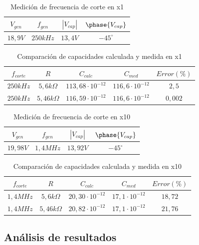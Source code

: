 \begin{table}[H]
	\centering
	\caption{Medici\'on de frecuencia de corte en x1}
	\begin{tabular}{c c c c}
		$V_{gen}$ & $f_{gen}$ & $|V_{cap}|$ & $\phase{V_{cap}}$ \\
		\hline
		$18,9V$ & $250kHz$ & $13,4V$ & $-45^{\circ}$		
	\end{tabular}
\end{table}

\begin{table}[H]
	\centering
	\caption{Comparaci\'on de capacidades calculada y medida en x1}
	\begin{tabular}{c c c c c}
		$f_{corte}$ & $R$ & $C_{calc}$ & $C_{med}$ & $Error(\%)$ \\
		\hline
		$250kHz$ & $5,6k \Omega$ & $113,68 \cdot 10^{-12}$ & $116,6 \cdot 10^{-12}$ & $2,5$ \\
		$250kHz$ & $5,46k \Omega$ & $116,59 \cdot 10^{-12}$ & $116,6 \cdot 10^{-12}$ & $0,002$
	\end{tabular}
\end{table}

\begin{table}[H]
	\centering
	\caption{Medici\'on de frecuencia de corte en x10}
	\begin{tabular}{c c c c}
		$V_{gen}$ & $f_{gen}$ & $|V_{cap}|$ & $\phase{V_{cap}}$ \\
		\hline
		$19,98V$ & $1,4MHz$ & $13,92V$ & $-45^{\circ}$		
	\end{tabular}
\end{table}

\begin{table}[H]
	\centering
	\caption{Comparaci\'on de capacidades calculada y medida en x10}
	\begin{tabular}{c c c c c}
		$f_{corte}$ & $R$ & $C_{calc}$ & $C_{med}$ & $Error(\%)$ \\
		\hline
		$1,4MHz$ & $5,6k \Omega$ & $20,30 \cdot 10^{-12}$ & $17,1 \cdot 10^{-12}$ & $18,72$ \\
		$1,4MHz$ & $5,46k \Omega$ & $20,82 \cdot 10^{-12}$ & $17,1 \cdot 10^{-12}$ & $21,76$
	\end{tabular}
\end{table}

\subsection{Análisis de resultados}

